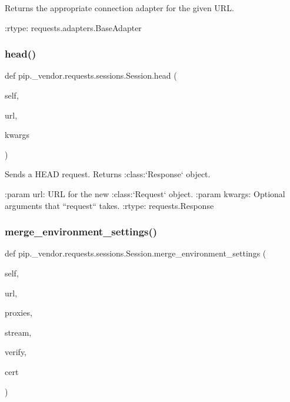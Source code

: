 \begin{DoxyVerb}Returns the appropriate connection adapter for the given URL.

:rtype: requests.adapters.BaseAdapter
\end{DoxyVerb}
 \mbox{\label{classpip_1_1__vendor_1_1requests_1_1sessions_1_1Session_a79660eefa6423f4233a298039a837d92}} 
\subsubsection{\texorpdfstring{head()}{head()}}
{\footnotesize\ttfamily def pip.\+\_\+vendor.\+requests.\+sessions.\+Session.\+head (\begin{DoxyParamCaption}\item[{}]{self,  }\item[{}]{url,  }\item[{}]{kwargs }\end{DoxyParamCaption})}

\begin{DoxyVerb}Sends a HEAD request. Returns :class:`Response` object.

:param url: URL for the new :class:`Request` object.
:param \*\*kwargs: Optional arguments that ``request`` takes.
:rtype: requests.Response
\end{DoxyVerb}
 \mbox{\label{classpip_1_1__vendor_1_1requests_1_1sessions_1_1Session_a281aa976ac215f2b76d4309e4091a7a4}} 
\subsubsection{\texorpdfstring{merge\+\_\+environment\+\_\+settings()}{merge\_environment\_settings()}}
{\footnotesize\ttfamily def pip.\+\_\+vendor.\+requests.\+sessions.\+Session.\+merge\+\_\+environment\+\_\+settings (\begin{DoxyParamCaption}\item[{}]{self,  }\item[{}]{url,  }\item[{}]{proxies,  }\item[{}]{stream,  }\item[{}]{verify,  }\item[{}]{cert }\end{DoxyParamCaption})}

